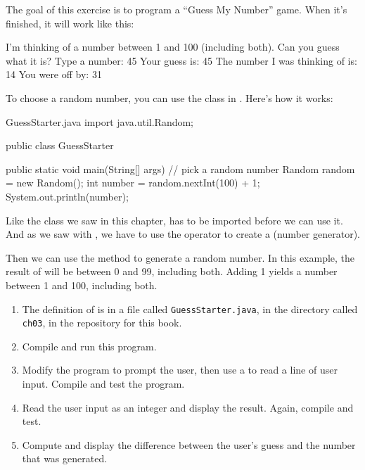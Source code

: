 \begin{exercise}  %
\label{guess}

The goal of this exercise is to program a ``Guess My Number'' game.
When it's finished, it will work like this:

\begin{stdout}
I'm thinking of a number between 1 and 100
(including both). Can you guess what it is?
Type a number: 45
Your guess is: 45
The number I was thinking of is: 14
You were off by: 31
\end{stdout}

To choose a random number, you can use the  class in .
Here's how it works:

\begin{trinket}{GuessStarter.java}
import java.util.Random;

public class GuessStarter {

    public static void main(String[] args) {
        // pick a random number
        Random random = new Random();
        int number = random.nextInt(100) + 1;
        System.out.println(number);
    }
}
\end{trinket}


Like the  class we saw in this chapter,  has to be imported before we can use it.
And as we saw with , we have to use the  operator to create a  (number generator).

Then we can use the method  to generate a random number.
In this example, the result of  will be between 0 and 99, including both.
Adding 1 yields a number between 1 and 100, including both.

\begin{enumerate}

\item The definition of  is in a file called {\tt GuessStarter.java}, in the directory called {\tt ch03}, in the repository for this book.

\item Compile and run this program.

\item Modify the program to prompt the user, then use a  to read a line of user input.
Compile and test the program.

\item Read the user input as an integer and display the result.
Again, compile and test.

\item Compute and display the difference between the user's guess and the number that was generated.

\end{enumerate}

\end{exercise}
